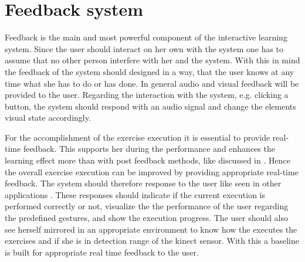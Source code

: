 \section{Feedback system}\label{4_5_feedbackSystem}



Feedback is the main and most powerful component of the interactive learning system. Since the user should interact on her own with the system one has to assume that no other person interfere with her and the system. With this in mind the feedback of the system should designed in a way, that the user knows at any time what she has to do or has done. In general audio and visual feedback will be provided to the user. Regarding the interaction with the system, e.g. clicking a button, the system should respond with an audio signal and change the elements visual state accordingly.

For the accomplishment of the exercise execution it is essential to provide real-time feedback. This supports her during the performance and enhances the learning effect more than with post feedback methods, like discussed in \textit{}. Hence the overall exercise execution can be improved by providing appropriate real-time feedback. The system should therefore response to the user like seen in other applications \textbf{}. These responses should indicate if the current execution is performed correctly or not, visualize the the performance of the user regarding the predefined gestures, and show the execution progress. The user should also see herself mirrored in an appropriate environment to know how the executes the exercises and if she is in detection range of the kinect sensor. With this a baseline is built for appropriate real time feedback to the user.

